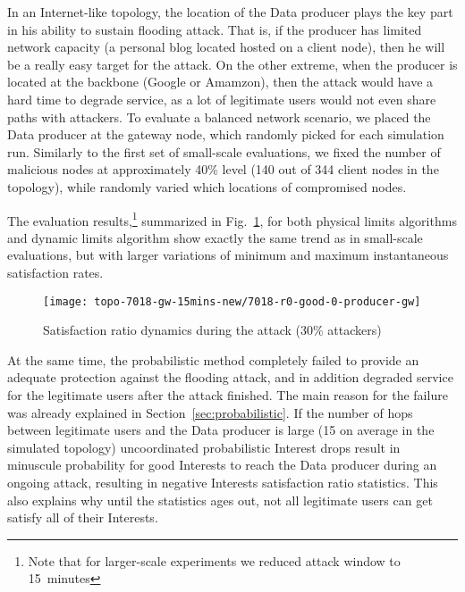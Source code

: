 In an Internet-like topology, the location of the Data producer plays the key part in his ability to sustain flooding attack.
That is, if the producer has limited network capacity (a personal blog located hosted on a client node), then he will be a really easy target for the attack.
On the other extreme, when the producer is located at the backbone (Google or Amamzon), then the attack would have a hard time to degrade service, as a lot of legitimate users would not even share paths with attackers.
To evaluate a balanced network scenario, we placed the Data producer at the gateway node, which randomly picked for each simulation run.
Similarly to the first set of small-scale evaluations, we fixed the number of malicious nodes at approximately 40\% level (140 out of 344 client nodes in the topology), while randomly varied which locations of compromised nodes.


The evaluation results,\footnote{Note that for larger-scale experiments we reduced attack window to 15~minutes} summarized in Fig.~\ref{fig:large-scale}, for both physical limits algorithms and dynamic limits algorithm show exactly the same trend as in small-scale evaluations, but with larger variations of minimum and maximum instantaneous satisfaction rates.

\begin{figure}[tbh]
 \centering
 \texttt{[image: topo-7018-gw-15mins-new/7018-r0-good-0-producer-gw]}
 \caption{Satisfaction ratio dynamics during the attack (30\% attackers)}
 \label{fig:large-scale}
\end{figure}

At the same time, the probabilistic method completely failed to provide an adequate protection against the flooding attack, and in addition degraded service for the legitimate users after the attack finished.
The main reason for the failure was already explained in Section~\ref{sec:probabilistic}.
If the number of hops between legitimate users and the Data producer is large (15 on average in the simulated topology) uncoordinated probabilistic Interest drops result in minuscule probability for good Interests to reach the Data producer during an ongoing attack, resulting in negative Interests satisfaction ratio statistics.
This also explains why until the statistics ages out, not all legitimate users can get satisfy all of their Interests.

